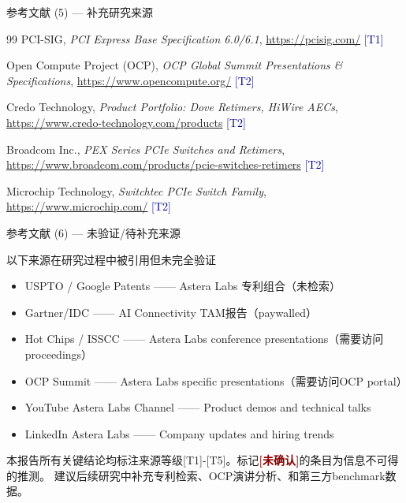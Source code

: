 \documentclass[UTF8,11pt,aspectratio=169]{beamer}
\newcommand{\sourceT}[1]{{\small\textcolor{darkblue}{[T#1]}}}
\newcommand{\unverified}{{\textcolor{darkred}{\textbf{[未确认]}}}}
\begin{document}
\begin{frame}{参考文献 (5) — 补充研究来源}
    \begin{thebibliography}{99}
        PCI-SIG,
        \emph{PCI Express Base Specification 6.0/6.1},
        \url{https://pcisig.com/}
        \sourceT{1}

        Open Compute Project (OCP),
        \emph{OCP Global Summit Presentations \& Specifications},
        \url{https://www.opencompute.org/}
        \sourceT{2}

        Credo Technology,
        \emph{Product Portfolio: Dove Retimers, HiWire AECs},
        \url{https://www.credo-technology.com/products}
        \sourceT{2}

        Broadcom Inc.,
        \emph{PEX Series PCIe Switches and Retimers},
        \url{https://www.broadcom.com/products/pcie-switches-retimers}
        \sourceT{2}

        Microchip Technology,
        \emph{Switchtec PCIe Switch Family},
        \url{https://www.microchip.com/}
        \sourceT{2}
    \end{thebibliography}
\end{frame}

\begin{frame}{参考文献 (6) — 未验证/待补充来源}
    \begin{alertblock}{以下来源在研究过程中被引用但未完全验证}
        \begin{itemize}
            \item USPTO / Google Patents —— Astera Labs 专利组合（未检索）
            \item Gartner/IDC —— AI Connectivity TAM报告（paywalled）
            \item Hot Chips / ISSCC —— Astera Labs conference presentations（需要访问proceedings）
            \item OCP Summit —— Astera Labs specific presentations（需要访问OCP portal）
            \item YouTube Astera Labs Channel —— Product demos and technical talks
            \item LinkedIn Astera Labs —— Company updates and hiring trends
        \end{itemize}
    \end{alertblock}

    \begin{keypoint}
        本报告所有关键结论均标注来源等级[T1]-[T5]。标记\unverified 的条目为信息不可得的推测。
        建议后续研究中补充专利检索、OCP演讲分析、和第三方benchmark数据。
    \end{keypoint}
\end{frame}
\end{document}

